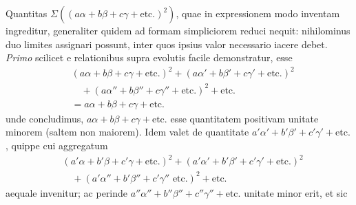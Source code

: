 Quantitas \(\Sigma((a\alpha+b\beta+c\gamma+\text{etc.})^2)\), quae in expressionem modo inventam ingreditur, generaliter quidem ad formam simpliciorem reduci nequit: nihilominus duo limites assignari possunt, inter quos ipsius valor necessario iacere debet. \textit{Primo} scilicet e relationibus supra evolutis facile demonstratur, esse
\[
\begin{aligned}
&(a\alpha+b\beta+c\gamma+\text{etc.})^2+(a\alpha'+b\beta'+c\gamma'+\text{etc.})^2\\
&\quad+(a\alpha''+b\beta''+c\gamma''+\text{etc.})^2+\text{etc.}\\
&=a\alpha+b\beta+c\gamma+\text{etc.}
\end{aligned}
\]
unde concludimus, \(a\alpha+b\beta+c\gamma+\text{etc.}\) esse quantitatem positivam unitate minorem (saltem non maiorem). Idem valet de quantitate \(a'\alpha'+b'\beta'+c'\gamma'+\text{etc.}\), quippe cui aggregatum
\[
\begin{aligned}
&(a'\alpha+b'\beta+c'\gamma+\text{etc.})^2+(a'\alpha'+b'\beta'+c'\gamma'+\text{etc.})^2\\
&\quad+(a'\alpha''+b'\beta''+c'\gamma''\text{ etc.})^2+\text{etc.}
\end{aligned}
\]
aequale invenitur; ac perinde \(a''\alpha''+b''\beta''+c''\gamma''+\text{etc.}\) unitate minor erit, et sic
